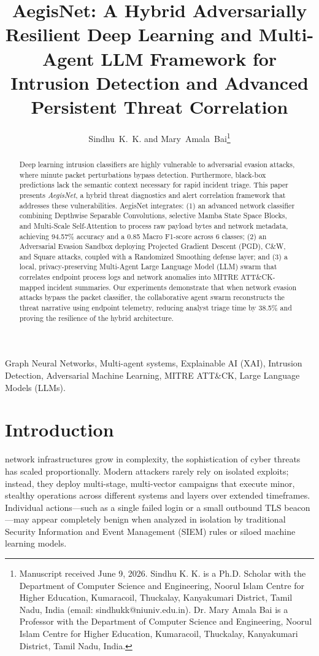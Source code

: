 \documentclass[journal,twoside]{IEEEtran}
\title{AegisNet: A Hybrid Adversarially Resilient Deep Learning and Multi-Agent LLM Framework for Intrusion Detection and Advanced Persistent Threat Correlation}
\author{Sindhu~K.~K. and Mary~Amala~Bai\thanks{Manuscript received June 9, 2026. Sindhu K. K. is a Ph.D. Scholar with the Department of Computer Science and Engineering, Noorul Islam Centre for Higher Education, Kumaracoil, Thuckalay, Kanyakumari District, Tamil Nadu, India (email: sindhukk@niuniv.edu.in). Dr. Mary Amala Bai is a Professor with the Department of Computer Science and Engineering, Noorul Islam Centre for Higher Education, Kumaracoil, Thuckalay, Kanyakumari District, Tamil Nadu, India.}}
\begin{document}
\maketitle

\begin{abstract}
Deep learning intrusion classifiers are highly vulnerable to adversarial evasion attacks, where minute packet perturbations bypass detection. Furthermore, black-box predictions lack the semantic context necessary for rapid incident triage. This paper presents \textit{AegisNet}, a hybrid threat diagnostics and alert correlation framework that addresses these vulnerabilities. AegisNet integrates: (1) an advanced network classifier combining Depthwise Separable Convolutions, selective Mamba State Space Blocks, and Multi-Scale Self-Attention to process raw payload bytes and network metadata, achieving 94.57\% accuracy and a 0.85 Macro F1-score across 6 classes; (2) an Adversarial Evasion Sandbox deploying Projected Gradient Descent (PGD), C\&W, and Square attacks, coupled with a Randomized Smoothing defense layer; and (3) a local, privacy-preserving Multi-Agent Large Language Model (LLM) swarm that correlates endpoint process logs and network anomalies into MITRE ATT\&CK-mapped incident summaries. Our experiments demonstrate that when network evasion attacks bypass the packet classifier, the collaborative agent swarm reconstructs the threat narrative using endpoint telemetry, reducing analyst triage time by 38.5\% and proving the resilience of the hybrid architecture.
\end{abstract}

\begin{IEEEkeywords}
Graph Neural Networks, Multi-agent systems, Explainable AI (XAI), Intrusion Detection, Adversarial Machine Learning, MITRE ATT\&CK, Large Language Models (LLMs).
\end{IEEEkeywords}

\section{Introduction}
\label{sec:introduction}
 network infrastructures grow in complexity, the sophistication of cyber threats has scaled proportionally. Modern attackers rarely rely on isolated exploits; instead, they deploy multi-stage, multi-vector campaigns that execute minor, stealthy operations across different systems and layers over extended timeframes. Individual actions—such as a single failed login or a small outbound TLS beacon—may appear completely benign when analyzed in isolation by traditional Security Information and Event Management (SIEM) rules or siloed machine learning models.
\end{document}
